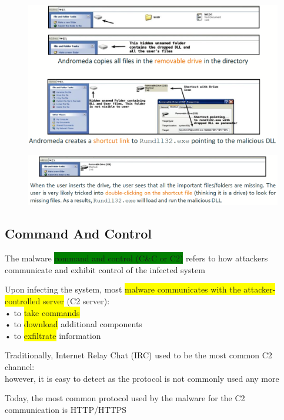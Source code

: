 \documentclass[]{project_plan}
\begin{document}
\begin{figure}[H]
  \centering
  \includegraphics[width=\linewidth]{replication 3.png}
\end{figure}

\begin{figure}[H]
  \centering
  \includegraphics[width=\linewidth]{replication 4.png}
\end{figure}

\subsection{Command And Control}
The malware \colorbox{green}{command and control (C\&C or C2)} refers to how attackers communicate and
exhibit control of the infected system

Upon infecting the system, most \colorbox{yellow}{malware communicates with the attacker-controlled server} (C2 server):\\
• to \colorbox{yellow}{take commands}\\
• to \colorbox{yellow}{download} additional components\\
• to \colorbox{yellow}{exfiltrate} information

Traditionally, Internet Relay Chat (IRC) used to be the most common C2 channel:\\
however, it is easy to detect as the protocol is not commonly used any more

Today, the most common protocol used by the malware for the C2 communication is
HTTP/HTTPS
\end{document}
